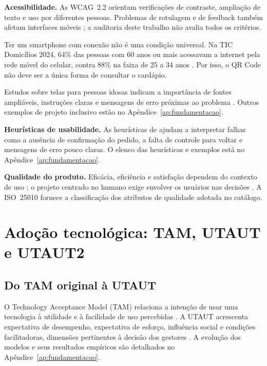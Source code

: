 \textbf{Acessibilidade.} As WCAG~2.2 \cite{wcag22} orientam verificações de contraste, ampliação de texto e uso por diferentes pessoas. Problemas de rotulagem e de feedback também afetam interfaces móveis \cite{marques2025acessibilidademobile}; a auditoria deste trabalho não avalia todos os critérios.

Ter um smartphone com conexão não é uma condição universal. Na TIC Domicílios 2024, 64\% das pessoas com 60 anos ou mais acessavam a internet pela rede móvel do celular, contra 88\% na faixa de 25 a 34 anos \cite{cetic2024domicilios}. Por isso, o QR Code não deve ser a única forma de consultar o cardápio.

Estudos sobre telas para pessoas idosas indicam a importância de fontes ampliáveis, instruções claras e mensagens de erro próximas ao problema \cite{mclaughlin2020designing,lara2010acessibilidade}. Outros exemplos de projeto inclusivo estão no Apêndice~\ref{ap:fundamentacao}.

\textbf{Heurísticas de usabilidade.} As heurísticas de  ajudam a interpretar falhas como a ausência de confirmação do pedido, a falta de controle para voltar e mensagens de erro pouco claras. O elenco das heurísticas e exemplos está no Apêndice~\ref{ap:fundamentacao}.

\textbf{Qualidade do produto.} Eficácia, eficiência e satisfação dependem do contexto de uso \cite{iso9241-11}; o projeto centrado no humano exige envolver os usuários nas decisões \cite{iso9241-210}. A ISO~25010 \cite{iso25010} fornece a classificação dos atributos de qualidade adotada no catálogo.

\section{Adoção tecnológica: TAM, UTAUT e UTAUT2}
\label{sec:adocao}

\subsection{Do TAM original à UTAUT}
\label{sec:tam-utaut}

O Technology Acceptance Model (TAM) relaciona a intenção de usar uma tecnologia à utilidade e à facilidade de uso percebidas \cite{davis1989perceived}. A UTAUT acrescenta expectativa de desempenho, expectativa de esforço, influência social e condições facilitadoras, dimensões pertinentes à decisão dos gestores \cite{venkatesh2003useracceptance}. A evolução dos modelos e seus resultados empíricos são detalhados no Apêndice~\ref{ap:fundamentacao}.

